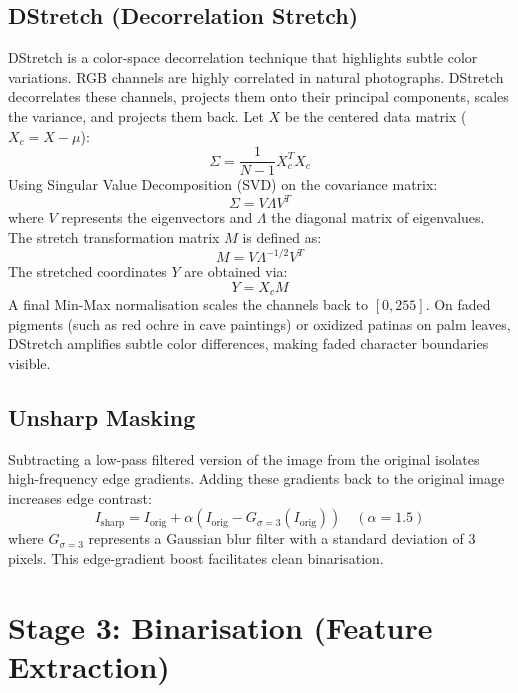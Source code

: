 \subsection{DStretch (Decorrelation Stretch)}
DStretch is a color-space decorrelation technique that highlights subtle color variations. RGB channels are highly correlated in natural photographs. DStretch decorrelates these channels, projects them onto their principal components, scales the variance, and projects them back.
Let $X$ be the centered data matrix ($X_c = X - \mu$):
\begin{equation}
\Sigma = \frac{1}{N - 1} X_c^T X_c
\end{equation}
Using Singular Value Decomposition (SVD) on the covariance matrix:
\begin{equation}
\Sigma = V \Lambda V^T
\end{equation}
where $V$ represents the eigenvectors and $\Lambda$ the diagonal matrix of eigenvalues. The stretch transformation matrix $M$ is defined as:
\begin{equation}
M = V \Lambda^{-1/2} V^T
\end{equation}
The stretched coordinates $Y$ are obtained via:
\begin{equation}
Y = X_c M
\end{equation}
A final Min-Max normalisation scales the channels back to $[0, 255]$. On faded pigments (such as red ochre in cave paintings) or oxidized patinas on palm leaves, DStretch amplifies subtle color differences, making faded character boundaries visible.

\subsection{Unsharp Masking}
Subtracting a low-pass filtered version of the image from the original isolates high-frequency edge gradients. Adding these gradients back to the original image increases edge contrast:
\begin{equation}
I_{\text{sharp}} = I_{\text{orig}} + \alpha \left( I_{\text{orig}} - G_{\sigma=3}(I_{\text{orig}}) \right) \quad (\alpha = 1.5)
\end{equation}
where $G_{\sigma=3}$ represents a Gaussian blur filter with a standard deviation of 3 pixels. This edge-gradient boost facilitates clean binarisation.

\section{Stage 3: Binarisation (Feature Extraction)}\label{sec:binarisation}

